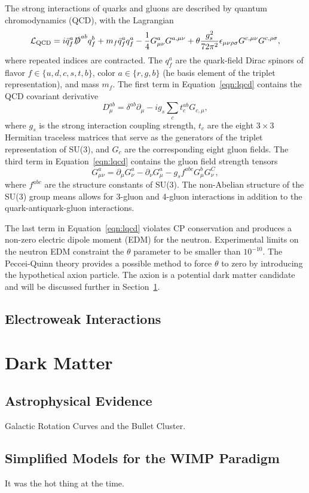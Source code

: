 The strong interactions of quarks and gluons are described by quantum chromodynamics (QCD), with the Lagrangian
\begin{equation}
  \label{eqn:lqcd}
  \mathcal{L}_{\text{QCD}} = i \bar q_f^a \slashed D^{ab} q_f^b + m_f \bar q_f^a q_f^a - \frac{1}{4} G_{\mu\nu}^a G^{a,\mu\nu} + \theta \frac{g_s^2}{72\pi^2} \epsilon_{\mu\nu\rho\sigma} G^{c,\mu\nu} G^{c, \rho\sigma},
\end{equation}
where repeated indices are contracted.
The $q_f^a$ are the quark-field Dirac spinors of flavor $f \in \{u,d,c,s,t,b\}$, color $a \in \{r,g,b\}$ (he basis element of the triplet representation), and mass $m_f$.
The first term in Equation~\ref{eqn:lqcd} contains the QCD covariant derivative
\begin{equation}
  D_{\mu}^{ab} = \delta^{ab} \partial_\mu - i g_s \sum_{c} t_c^{ab} G_{c,\mu},
\end{equation}
where $g_s$ is the strong interaction coupling strength, $t_c$ are the eight $3\times3$ Hermitian traceless matrices that serve as the generators of the triplet representation of SU(3), and $G_c$ are the corresponding eight gluon fields.
The third term in Equation~\ref{eqn:lqcd} contains the gluon field strength tensors
\begin{equation}
  G_{\mu\nu}^a = \partial_\mu G_\nu^a - \partial_\nu G_\mu^a - g_s f^{abc} G_\mu^b G_\nu^C,
\end{equation}
where $f^{abc}$ are the structure constants of SU(3).
The non-Abelian structure of the SU(3) group means allows for 3-gluon and 4-gluon interactions in addition to the quark-antiquark-gluon interactions.

The last term in Equation~\ref{eqn:lqcd} violates CP conservation and produces a non-zero electric dipole moment (EDM) for the neutron.
Experimental limits on the neutron EDM constraint the $\theta$ parameter to be smaller than $10^{-10}$.
The Peccei-Quinn theory provides a possible method to force $\theta$ to zero by introducing the hypothetical axion particle. The axion is a potential dark matter candidate and will be discussed further in Section~\ref{sec:dm}.

\subsection{Electroweak Interactions}
\label{subsec:ewk}

\section{Dark Matter}
\label{sec:dm}

\subsection{Astrophysical Evidence}

Galactic Rotation Curves and the Bullet Cluster.

\subsection{Simplified Models for the WIMP Paradigm}

It was the hot thing at the time.

